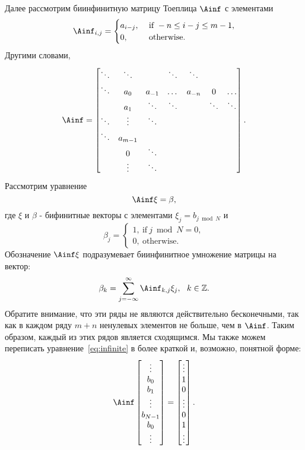 %
Далее рассмотрим биинфинитную матрицу Тоеплица $\Ainf$ с элементами
\[
\Ainf_{i,j}
=
\begin{cases}
a_{i-j},~&\text{if } -n \le i-j \le m-1,\\
0,~&\text{otherwise}.
\end{cases}
\]
Другими словами,
\[
\Ainf = \begin{bmatrix}
\ddots & \ddots &        & \ddots  & \ddots  &        &        \\
\ddots & a_0    & a_{-1} & \dots   &  a_{-n} &    0   & \dots  \\
& a_1    & \ddots & \ddots  &         & \ddots & \ddots \\
\ddots & \vdots & \ddots &         &         &        &        \\
\ddots & a_{m-1}&        &         &         &        &        \\
& 0      & \ddots &         &         &        &        \\
& \vdots & \ddots &         &         &        &        
\end{bmatrix}.
\]
Рассмотрим уравнение
\begin{equation}\label{eq:infinite}
\Ainf \xi = \beta,
\end{equation}
где $\xi$ и $\beta$ - бифинитные векторы с элементами
$\xi_{j} = b_{j \bmod N}$ и
\[
\beta_{j} = \begin{cases}
1,~\text{if}~j \bmod N = 0, \\
0,~\text{otherwise}.
\end{cases}
\]
Обозначение $\Ainf\xi$ подразумевает биинфинитное умножение матрицы на вектор:
\[
\beta_{k} = \sum_{j=-\infty}^{\infty}\Ainf_{k,j}\xi_{j},~~ k \in \mathbb{Z}.
\]
Обратите внимание, что эти ряды не являются действительно бесконечными, так как в каждом ряду $m+n$ ненулевых элементов не больше, чем в $\Ainf$.
Таким образом, каждый из этих рядов является сходящимся.
Мы также можем переписать уравнение~\eqref{eq:infinite} в более краткой и, возможно, понятной форме:
\[
\Ainf
\begin{bmatrix}
\vdots \\
b_0 \\
b_1 \\
\vdots \\
b_{N-1} \\
b_0 \\
\vdots
\end{bmatrix}
=
\begin{bmatrix}
\vdots \\
1 \\
0 \\
\vdots \\
0 \\
1 \\
\vdots
\end{bmatrix}.
\]
